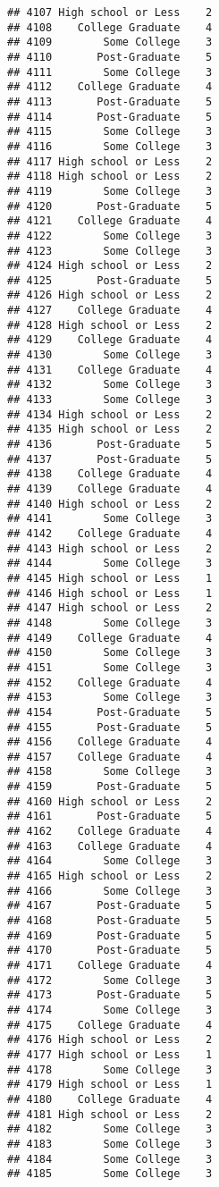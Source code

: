 \documentclass[
]{article}
\begin{document}
\begin{verbatim}
## 4107 High school or Less    2
## 4108    College Graduate    4
## 4109        Some College    3
## 4110       Post-Graduate    5
## 4111        Some College    3
## 4112    College Graduate    4
## 4113       Post-Graduate    5
## 4114       Post-Graduate    5
## 4115        Some College    3
## 4116        Some College    3
## 4117 High school or Less    2
## 4118 High school or Less    2
## 4119        Some College    3
## 4120       Post-Graduate    5
## 4121    College Graduate    4
## 4122        Some College    3
## 4123        Some College    3
## 4124 High school or Less    2
## 4125       Post-Graduate    5
## 4126 High school or Less    2
## 4127    College Graduate    4
## 4128 High school or Less    2
## 4129    College Graduate    4
## 4130        Some College    3
## 4131    College Graduate    4
## 4132        Some College    3
## 4133        Some College    3
## 4134 High school or Less    2
## 4135 High school or Less    2
## 4136       Post-Graduate    5
## 4137       Post-Graduate    5
## 4138    College Graduate    4
## 4139    College Graduate    4
## 4140 High school or Less    2
## 4141        Some College    3
## 4142    College Graduate    4
## 4143 High school or Less    2
## 4144        Some College    3
## 4145 High school or Less    1
## 4146 High school or Less    1
## 4147 High school or Less    2
## 4148        Some College    3
## 4149    College Graduate    4
## 4150        Some College    3
## 4151        Some College    3
## 4152    College Graduate    4
## 4153        Some College    3
## 4154       Post-Graduate    5
## 4155       Post-Graduate    5
## 4156    College Graduate    4
## 4157    College Graduate    4
## 4158        Some College    3
## 4159       Post-Graduate    5
## 4160 High school or Less    2
## 4161       Post-Graduate    5
## 4162    College Graduate    4
## 4163    College Graduate    4
## 4164        Some College    3
## 4165 High school or Less    2
## 4166        Some College    3
## 4167       Post-Graduate    5
## 4168       Post-Graduate    5
## 4169       Post-Graduate    5
## 4170       Post-Graduate    5
## 4171    College Graduate    4
## 4172        Some College    3
## 4173       Post-Graduate    5
## 4174        Some College    3
## 4175    College Graduate    4
## 4176 High school or Less    2
## 4177 High school or Less    1
## 4178        Some College    3
## 4179 High school or Less    1
## 4180    College Graduate    4
## 4181 High school or Less    2
## 4182        Some College    3
## 4183        Some College    3
## 4184        Some College    3
## 4185        Some College    3

\end{verbatim}
\end{document}
